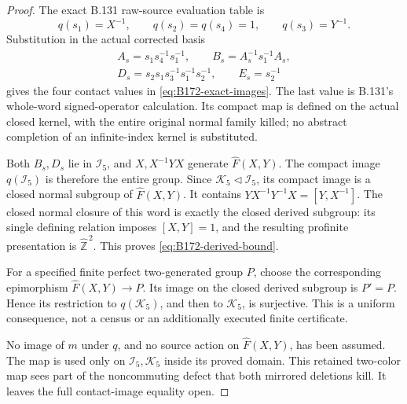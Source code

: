 \begin{proof}
The exact B.131 raw-source evaluation table is
\[
 q(s_1)=X^{-1},\qquad q(s_2)=q(s_4)=1,\qquad q(s_3)=Y^{-1}.
\]
Substitution in the actual corrected basis
\[
 \begin{gathered}
 A_s=s_1s_4^{-1}s_1^{-1},\qquad
 B_s=A_s^{-1}s_1^{-1}A_s,\\
 D_s=s_2s_1s_3^{-1}s_1^{-1}s_2^{-1},\qquad E_s=s_2^{-1}
 \end{gathered}
\]
gives the four contact values in \eqref{eq:B172-exact-images}.
The last value is B.131's whole-word signed-operator calculation.
Its compact map is defined on the actual closed kernel, with the
entire original normal family killed; no abstract completion of
an infinite-index kernel is substituted.

Both \(B_s,D_s\) lie in \(\mathcal I_5\), and
\(X,X^{-1}YX\) generate \(\widehat F(X,Y)\).
The compact image \(q(\mathcal I_5)\) is therefore the entire group.
Since \(\mathcal K_5\triangleleft\mathcal I_5\), its compact image
is a closed normal subgroup of \(\widehat F(X,Y)\).
It contains \(YX^{-1}Y^{-1}X=[Y,X^{-1}]\).
The closed normal closure of this word is exactly the closed derived
subgroup: its single defining relation imposes \([X,Y]=1\), and the
resulting profinite presentation is \(\widehat{\mathbb Z}^{\,2}\).
This proves \eqref{eq:B172-derived-bound}.

For a specified finite perfect two-generated group \(P\), choose the
corresponding epimorphism \(\widehat F(X,Y)\to P\).
Its image on the closed derived subgroup is \(P'=P\).
Hence its restriction to \(q(\mathcal K_5)\), and then to
\(\mathcal K_5\), is surjective. This is a uniform consequence, not
a census or an additionally executed finite certificate.

No image of \(m\) under \(q\), and no source action on
\(\widehat F(X,Y)\), has been assumed. The map is used only on
\(\mathcal I_5,\mathcal K_5\) inside its proved domain.
This retained two-color map sees part of the noncommuting defect that
both mirrored deletions kill. It leaves the full contact-image
equality open.
\end{proof}

